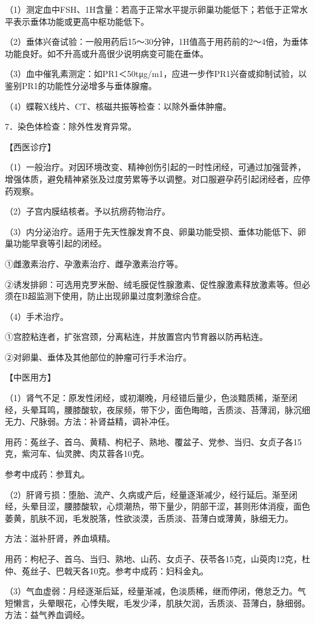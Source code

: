 \documentclass[12pt,UTF8]{ctexbook}
\begin{document}
（1）测定血中FSH、1H含量：若高于正常水平提示卵巢功能低下；若低于正常水平表示垂体功能或更高中枢功能低下。

（2）垂体兴奋试验：一般用药后15～30分钟，1H值高于用药前的2～4倍，为垂体功能良好。如不升高或升高很少说明病变可能在垂体。

（3）血中催乳素测定：如PR1＜50tμg/m1，应进一步作PR1兴奋或抑制试验，以鉴别PR1的功能性分泌增多与垂体腺瘤。

（4）蝶鞍X线片、CT、核磁共振等检查：以除外垂体肿瘤。

7．染色体检查：除外性发育异常。

【西医诊疗】

（1）一般治疗。对因环境改变、精神创伤引起的一时性闭经，可通过加强营养，增强体质，避免精神紧张及过度劳累等予以调整。对口服避孕药引起闭经者，应停药观察。

（2）子宫内膜结核者。予以抗痨药物治疗。

（3）内分泌治疗。适用于先天性腺发育不良、卵巢功能受损、垂体功能低下、卵巢功能早衰等引起的闭经。

①雌激素治疗、孕激素治疗、雌孕激素治疗等。

②诱发排卵：可选用克罗米酚、绒毛膜促性腺激素、促性腺激素释放激素等。但必须在B超监测下使用，防止出现卵巢过度刺激综合症。

（4）手术治疗。

①宫腔粘连者，扩张宫颈，分离粘连，并放置宫内节育器以防再粘连。

②对卵巢、垂体及其他部位的肿瘤可行手术治疗。

【中医用方】

（1）肾气不足：原发性闭经，或初潮晚，月经错后量少，色淡黯质稀，渐至闭经，头晕耳鸣，腰膝酸软，夜尿频，带下少，面色晦暗，舌质淡、苔薄润，脉沉细无力、尺脉弱。方法：补肾益精，调补冲任。

用药：菟丝子、首乌、黄精、枸杞子、熟地、覆盆子、党参、当归、女贞子各15克，紫河车、仙灵脾、肉苁蓉各10克。

参考中成药：参茸丸。

（2）肝肾亏损：堕胎、流产、久病或产后，经量逐渐减少，经行延后。渐至闭经，头晕目涩，腰膝酸软，心烦潮热，带下量少，阴部干涩，甚则形体消瘦，面色萎黄，肌肤不润，毛发脱落，性欲淡漠，舌质淡、苔薄白或薄黄，脉细无力。

方法：滋补肝肾，养血填精。

用药：枸杞子、首乌、当归、熟地、山药、女贞子、茯苓各15克，山萸肉12克，杜仲、菟丝子、巴戟天各10克。参考中成药：妇科金丸。

（3）气血虚弱：月经逐渐后延，经量渐减，色淡质稀，继而停闭，倦怠乏力。气短懒言，头晕眼花，心悸失眠，毛发少泽，肌肤欠润，舌质淡、苔薄白，脉细弱。方法：益气养血调经。
\end{document}
